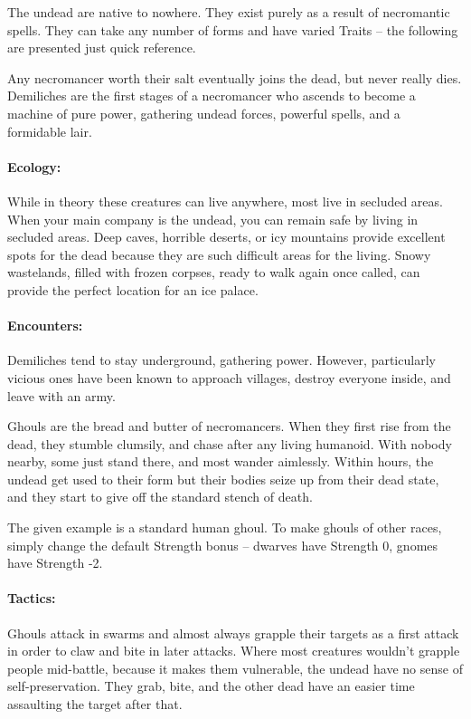 \begin{multicols}{2}

The undead are native to nowhere.
They exist purely as a result of necromantic spells.
They can take any number of forms and have varied Traits -- the following are presented just quick reference.

\label{demilich}

Any necromancer worth their salt eventually joins the dead, but never really dies.  Demiliches are the first stages of a necromancer who ascends to become a machine of pure power, gathering undead forces, powerful spells, and a formidable lair.

\paragraph{Ecology:} While in theory these creatures can live anywhere, most live in secluded areas.  When your main company is the undead, you can remain safe by living in secluded areas.  Deep caves, horrible deserts, or icy mountains provide excellent spots for the dead because they are such difficult areas for the living.  Snowy wastelands, filled with frozen corpses, ready to walk again once called, can provide the perfect location for an ice palace.

\paragraph{Encounters:} Demiliches tend to stay underground, gathering power.
However, particularly vicious ones have been known to approach villages, destroy everyone inside, and leave with an army.

\demilich

\label{ghoul}
Ghouls are the bread and butter of necromancers.
When they first rise from the dead, they stumble clumsily, and chase after any living humanoid.
With nobody nearby, some just stand there, and most wander aimlessly.
Within hours, the undead get used to their form but their bodies seize up from their dead state, and they start to give off the standard stench of death.

The given example is a standard human ghoul.
To make ghouls of other races, simply change the default Strength bonus -- dwarves have Strength 0, gnomes have Strength -2.

\paragraph{Tactics:}
Ghouls attack in swarms and almost always grapple their targets as a first attack in order to claw and bite in later attacks.
Where most creatures wouldn't grapple people mid-battle, because it makes them vulnerable, the undead have no sense of self-preservation.
They grab, bite, and the other dead have an easier time assaulting the target after that.


\end{multicols}

